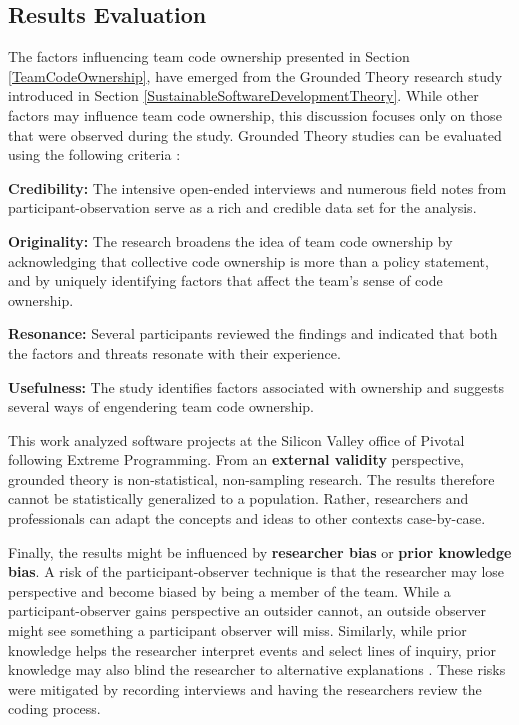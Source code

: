 \subsection{Results Evaluation}


The factors influencing team code ownership presented in Section \ref{TeamCodeOwnership}, have emerged from the Grounded Theory research study introduced in Section \ref{SustainableSoftwareDevelopmentTheory}. While other factors may influence team code ownership, this discussion focuses only on those that were observed during the study. Grounded Theory studies can be evaluated using the following criteria \cite{Charmaz}: 


\textbf{Credibility:}  The \numberOfInterviews{} intensive open-ended interviews and numerous field notes from participant-observation serve as a rich and credible data set for the analysis. 


\textbf{Originality:} The research broadens the idea of team code ownership by acknowledging that collective code ownership is more than a policy statement, and by uniquely identifying factors that affect the team's sense of code ownership.


\textbf{Resonance:} Several participants reviewed the findings and indicated that both the factors and threats resonate with their experience.


\textbf{Usefulness:} The study identifies factors associated with ownership and suggests several ways of engendering team code ownership.


This work analyzed software projects at the Silicon Valley office of Pivotal following Extreme Programming. From an \textbf{external validity} perspective, grounded theory is non-statistical, non-sampling research. The results therefore cannot be statistically generalized to a population. Rather, researchers and professionals can adapt the concepts and ideas to other contexts case-by-case. 


Finally, the results might be influenced by \textbf{researcher bias} or \textbf{prior knowledge bias}. A risk of the participant-observer technique is that the researcher may lose perspective and become biased by being a member of the team. While a participant-observer gains perspective an outsider cannot, an outside observer might see something a participant observer will miss. Similarly, while prior knowledge helps the researcher interpret events and select lines of inquiry, prior knowledge may also blind the researcher to alternative explanations \cite{GlaserIssues}. These risks were mitigated by recording interviews and having the researchers review the coding process. 


